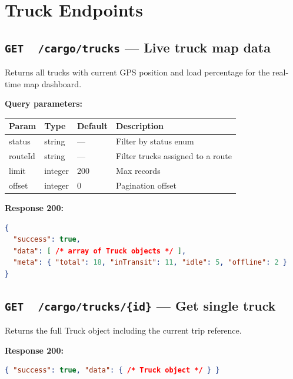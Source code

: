 \documentclass{article}
\newcommand{\GET}{\colorbox{evblue!20}{\texttt{\textbf{\color{evblue}GET}}}}
\begin{document}
\section{Truck Endpoints}

\subsection{\GET\ \ \texttt{/cargo/trucks} --- Live truck map data}

Returns all trucks with current GPS position and load percentage for the
real-time map dashboard.

\textbf{Query parameters:}

\begin{center}
\begin{tabular}{>{\ttfamily}llll}
\toprule
\textbf{Param} & \textbf{Type} & \textbf{Default} & \textbf{Description}\\
\midrule
status    & string  & ---   & Filter by status enum\\
routeId   & string  & ---   & Filter trucks assigned to a route\\
limit     & integer & 200   & Max records\\
offset    & integer & 0     & Pagination offset\\
\bottomrule
\end{tabular}
\end{center}

\textbf{Response 200:}
\begin{lstlisting}[language=json, caption=Live truck list response]
{
  "success": true,
  "data": [ /* array of Truck objects */ ],
  "meta": { "total": 18, "inTransit": 11, "idle": 5, "offline": 2 }
}
\end{lstlisting}

\subsection{\GET\ \ \texttt{/cargo/trucks/\{id\}} --- Get single truck}

Returns the full Truck object including the current trip reference.

\textbf{Response 200:}
\begin{lstlisting}[language=json]
{ "success": true, "data": { /* Truck object */ } }
\end{lstlisting}
\end{document}
